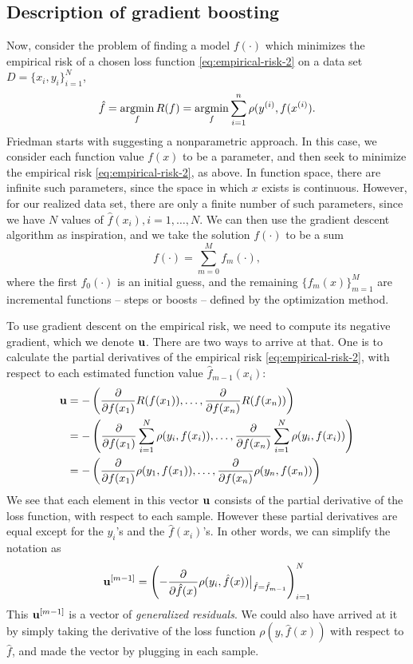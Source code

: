 \subsection{Description of gradient boosting}
Now, consider the problem of finding a model $f(\cdot)$ which minimizes the empirical risk of a chosen loss function \eqref{eq:empirical-risk-2} on a data set $D=\{x_i,y_i\}_{i=1}^N$,
\begin{equation}
    \hat{f}=\operatorname*{argmin}_{f}R(f)=\operatorname*{argmin}_{f}\sum_{i=1}^n\rho(y^{(i)},f(x^{(i)}).
\end{equation}
Friedman starts with suggesting a nonparametric approach. In this case, we consider each function value $f(x)$ to be a parameter, and then seek to minimize the empirical risk \eqref{eq:empirical-risk-2}, as above. In function space, there are infinite such parameters, since the space in which $x$ exists is continuous. However, for our realized data set, there are only a finite number of such parameters, since we have $N$ values of $\hat{f}(x_i),i=1,\ldots,N$. We can then use the gradient descent algorithm as inspiration, and we take the solution $f(\cdot)$ to be a sum
\begin{equation}
    f(\cdot)=\sum_{m=0}^M f_m(\cdot),
\end{equation}
where the first $f_0(\cdot)$ is an initial guess, and the remaining $\{f_m(x)\}_{m=1}^M$ are incremental functions -- steps or boosts -- defined by the optimization method.

To use gradient descent on the empirical risk, we need to compute its negative gradient, which we denote $\mathbf{u}$. There are two ways to arrive at that. One is to calculate the partial derivatives of the empirical risk \eqref{eq:empirical-risk-2}, with respect to each estimated function value $\hat{f}_{m-1}(x_i)$:
\begin{align}
    \mathbf{u}&=-\left(\frac{\partial}{\partial f(x_1)}R(f(x_1)),\ldots,\frac{\partial}{\partial f(x_n)}R(f(x_n))\right) \\
    &=-\left(\frac{\partial}{\partial f(x_1)}\sum_{i=1}^N\rho(y_i, f(x_i)),\ldots,\frac{\partial}{\partial f(x_n)}\sum_{i=1}^N\rho(y_i, f(x_i))\right) \\
    &=-\left(\frac{\partial}{\partial f(x_1)}\rho(y_1, f(x_1)),\ldots,\frac{\partial}{\partial f(x_n)}\rho(y_n, f(x_n))\right)
\end{align}
We see that each element in this vector $\mathbf{u}$ consists of the partial derivative of the loss function, with respect to each sample. However these partial derivatives are equal except for the $y_i$'s and the $\hat{f}(x_i)$'s. In other words, we can simplify the notation as
\begin{equation}
    \mathbf{u}^{[m-1]}=\left(-\frac{\partial}{\partial \hat{f}(x)}\rho(y_i, \hat{f}(x))\big\rvert_{\hat{f}=\hat{f}_{m-1}}\right)_{i=1}^N
\end{equation}
This $\mathbf{u}^{[m-1]}$ is a vector of \textit{generalized residuals}. We could also have arrived at it by simply taking the derivative of the loss function $\rho(y,\hat{f}(x))$ with respect to $\hat{f}$, and made the vector by plugging in each sample.

